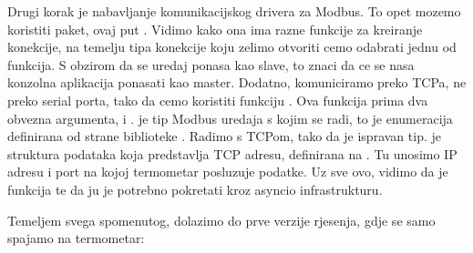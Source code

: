 \documentclass[letterpaper,10pt,croatian]{sphinxmanual}
\begin{document}
\sphinxAtStartPar
Drugi korak je nabavljanje komunikacijskog drivera za Modbus. To opet mozemo
koristiti  paket, ovaj put
.
Vidimo kako ona ima razne funkcije za kreiranje konekcije, na temelju tipa
konekcije koju zelimo otvoriti cemo odabrati jednu od  funkcija.
S obzirom da se uredaj ponasa kao slave, to znaci da ce se nasa konzolna
aplikacija ponasati kao master. Dodatno, komuniciramo preko TCP\sphinxhyphen{}a, ne preko
serial porta, tako da cemo koristiti funkciju
.
Ova funkcija prima dva obvezna argumenta,  i .
 je tip Modbus uredaja s kojim se radi, to je enumeracija
definirana od strane biblioteke .
Radimo s TCP\sphinxhyphen{}om, tako da je  ispravan tip.  je
struktura podataka koja predstavlja TCP adresu, definirana na
.
Tu unosimo IP adresu i port na kojoj termometar posluzuje podatke. Uz sve ovo,
vidimo da je  funkcija  te da ju je potrebno
pokretati kroz asyncio infrastrukturu.

\sphinxAtStartPar
Temeljem svega spomenutog, dolazimo do prve verzije rjesenja, gdje se samo
spajamo na termometar:
\end{document}
